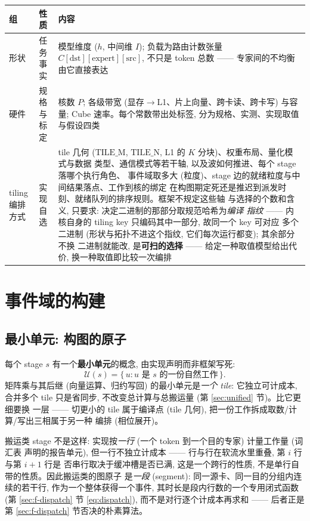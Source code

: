 \documentclass[11pt,a4paper]{article}
\newcommand{\TILEM}{\mathrm{TILE\_M}}
\newcommand{\TILEN}{\mathrm{TILE\_N}}
\newcommand{\unit}{\mathcal{U}}
\begin{document}
\begin{center}
\begin{tabular}{@{}llp{7.0cm}@{}}
\toprule
组 & 性质 & 内容 \\
\midrule
形状 & 任务事实
 & 模型维度 ($h$, 中间维 $I$); 负载为路由计数张量
   $C[\text{dst}][\text{expert}][\text{src}]$, 不只是 token 总数 ——
   专家间的不均衡由它直接表达 \\
硬件 & 规格与标定
 & 核数 $P$; 各级带宽 (显存$\to$L1、片上向量、跨卡读、跨卡写) 与容量;
   Cube 速率。每个常数带出处标签, 分为规格、实测、实现取值与假设四类 \\
tiling 编排方式 & 实现自选
 & tile 几何 ($\TILEM$, $\TILEN$, L1 的 $K$ 分块)、权重布局、量化模式与数据
   类型、通信模式等若干轴, 以及波如何推进、每个 stage 落哪个执行角色、
   事件域取多大 (粒度)、stage 边的就绪粒度与中间结果落点、工作到核的绑定
   在构图期定死还是推迟到派发时刻、就绪队列的排序规则。框架不规定这些轴
   与选择的个数和含义, 只要求: 决定二进制的那部分取规范哈希为\emph{编译
   指纹} —— 内核自身的 tiling key 只编码其中一部分, 故同一个 key 可对应
   多个二进制 (形状与拓扑不进这个指纹, 它们每次运行都变); 其余部分不换
   二进制就能改, 是\textbf{可扫的选择} —— 给定一种取值模型给出代价,
   换一种取值即比较一次编排 \\
\bottomrule
\end{tabular}
\end{center}

\section{事件域的构建}
\label{sec:build}

\subsection{最小单元: 构图的原子}
\label{sec:unit}

每个 stage $s$ 有一个\textbf{最小单元}的概念, 由实现声明而非框架写死:
\begin{equation}
\unit(s) = \{\,u : u \text{ 是 } s \text{ 的一份自然工作}\,\}.
\label{eq:units}
\end{equation}
矩阵乘与其后继 (向量运算、归约写回) 的最小单元是\emph{一个 tile}: 它独立可计成本,
合并多个 tile 只是省同步, 不改变总计算与总搬运量 (第 \ref{sec:unified} 节)。比它更细要换
一层 —— 切更小的 tile 属于编译点 (tile 几何), 把一份工作拆成取数/计算/写出三相属于另一种
编排 (相位展开)。

搬运类 stage 不是这样: 实现按\emph{一行} (一个 token 到一个目的专家) 计量工作量 (词汇表
声明的报告单元), 但一行不独立计成本 —— 行与行在软流水里重叠, 第 $i$ 行与第 $i{+}1$ 行是
否串行取决于缓冲槽是否已满, 这是一个跨行的性质, 不是单行自带的性质。因此搬运类的图原子
是\emph{一段} (segment): 同一源卡、同一目的分组内连续的若干行, 作为一个整体获得一个事件,
其时长是段内行数的一个专用闭式函数 (第 \ref{sec:f-dispatch} 节 \eqref{eq:dispatch}),
而不是对行逐个计成本再求和 —— 后者正是第 \ref{sec:f-dispatch} 节否决的朴素算法。
\end{document}
